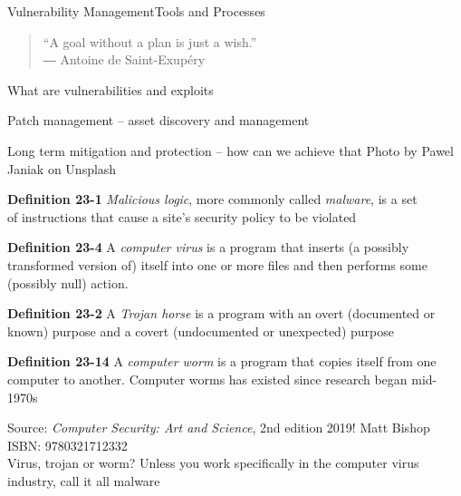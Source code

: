 \documentclass[Screen16to9,17pt]{foils}
\begin{document}
{}

\mytitlepage
{Vulnerability Management}{Tools and Processes}

\hlkprofiluk




\begin{quote}
  “A goal without a plan is just a wish.”\\
  ― Antoine de Saint-Exupéry
\end{quote}




\begin{list1}
\item What are vulnerabilities and exploits
\item Patch management -- asset discovery and management
\item Long term mitigation and protection -- how can we achieve that
\hskip 2cm {\footnotesize Photo by Pawel Janiak on Unsplash}
\end{list1}




\begin{list1}
\item {\bf Definition 23-1} \emph{Malicious logic}, more commonly called \emph{malware}, is a set\\
 of instructions that cause a site's security policy to be violated
 \item {\bf Definition 23-4} A \emph{computer virus} is a program that inserts (a possibly transformed version of) itself into one or more files and then performs some (possibly null) action.
\item {\bf Definition 23-2} A \emph{Trojan horse} is a program with an overt (documented or\\
known) purpose and a covert (undocumented or unexpected) purpose
\item {\bf Definition 23-14} A \emph{computer worm} is a program that copies itself from one computer to another. Computer worms has existed since research began mid-1970s
\end{list1}
Source: \emph{Computer Security: Art and Science}, 2nd edition 2019! Matt Bishop ISBN: 9780321712332\\
Virus, trojan or worm? Unless you work specifically in the computer virus industry, call it all malware
\end{document}

